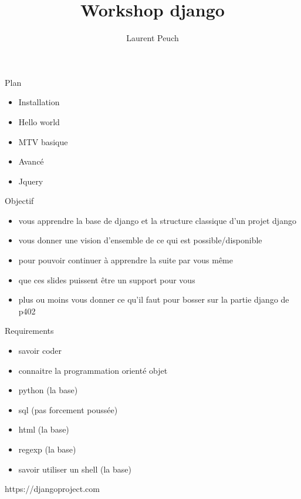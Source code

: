 \documentclass{beamer}
\begin{document}
\title{Workshop django}
\author{Laurent Peuch}

\maketitle{}

\begin{frame}{Plan}
    \begin{itemize}
        \item Installation
        \item Hello world
        \item MTV basique
        \item Avancé
        \item Jquery
    \end{itemize}
\end{frame}

\begin{frame}{Objectif}
\begin{itemize}
    \item vous apprendre la base de django et la structure classique d'un projet django
    \item vous donner une vision d'ensemble de ce qui est possible/disponible
    \item pour pouvoir continuer à apprendre la suite par vous même
    \item que ces slides puissent être un support pour vous
    \item plus ou moins vous donner ce qu'il faut pour bosser sur la partie django de p402
\end{itemize}
\end{frame}

\begin{frame}{Requirements}
\begin{itemize}
    \item savoir coder
    \item connaitre la programmation orienté objet
    \item python (la base)
    \item sql (pas forcement poussée)
    \item html (la base)
    \item regexp (la base)
    \item savoir utiliser un shell (la base)
\end{itemize}
\end{frame}

\begin{frame}[fragile]{}
    \LARGE \begin{center}https://djangoproject.com\end{center}
\end{frame}
\end{document}
